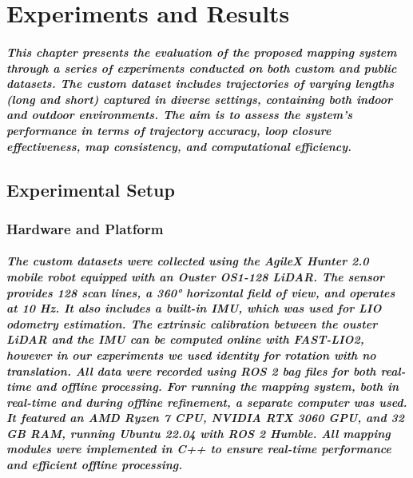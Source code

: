 \chapter{Experiments and Results}
\label{ch:results}
\paragraph{\textnormal{This chapter presents the evaluation of the proposed mapping system through a series of experiments conducted on both custom and public datasets. The custom dataset includes trajectories of varying lengths (long and short) captured in diverse settings, containing both indoor and outdoor environments. The aim is to assess the system's performance in terms of trajectory accuracy, loop closure effectiveness, map consistency, and computational efficiency.
}}
\section{Experimental Setup}
\label{sec:exp_setup}

\subsection{Hardware and Platform}
\label{sec:hw_platform}
\paragraph{\textnormal{The custom datasets were collected using the AgileX Hunter 2.0 mobile robot equipped with an Ouster OS1-128 LiDAR. The sensor provides 128 scan lines, a 360° horizontal field of view, and operates at 10 Hz. It also includes a built-in IMU, which was used for LIO odometry estimation. The extrinsic calibration between the ouster LiDAR and the IMU can be computed online with FAST-LIO2, however in our experiments we used identity for rotation with no translation. All data were recorded using ROS 2 bag files for both real-time and offline processing. For running the mapping system, both in real-time and during offline refinement, a separate computer was used. It featured an AMD Ryzen 7 CPU, NVIDIA RTX 3060 GPU, and 32 GB RAM, running Ubuntu 22.04 with ROS 2 Humble. All mapping modules were implemented in C++ to ensure real-time performance and efficient offline processing.
}}


